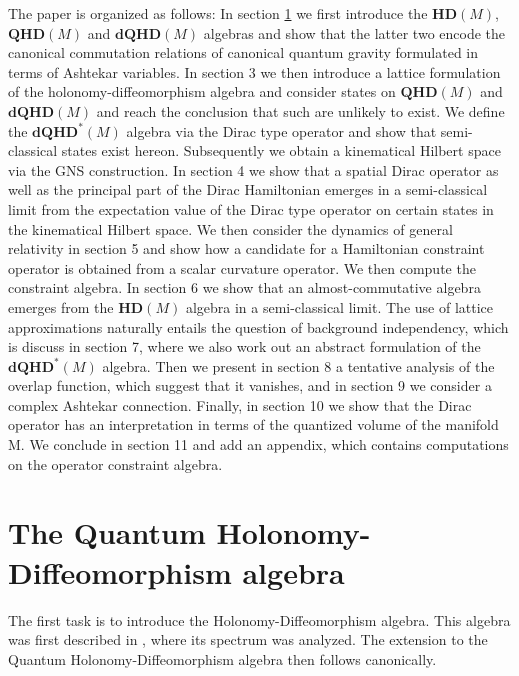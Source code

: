 \documentclass[12pt]{article}
\begin{document}
The paper is organized as follows: In section \ref{firsttask} we first introduce the $\mathbf{HD}(M)$, $\mathbf{QHD}(M)$ and $\mathbf{dQHD}(M)$ algebras and show that the latter two encode the canonical commutation relations of canonical quantum gravity formulated in terms of Ashtekar variables. In section 3 we then introduce a lattice formulation of the holonomy-diffeomorphism algebra and consider states on $\mathbf{QHD}(M)$ and $\mathbf{dQHD}(M)$ and reach the conclusion that such are unlikely to exist. We define the $\mathbf{dQHD}^*(M)$ algebra via the Dirac type operator and show that semi-classical states exist hereon. Subsequently we obtain a kinematical Hilbert space via the GNS construction. 
%
%
In section 4 we show that a spatial Dirac operator as well as the principal part of the Dirac Hamiltonian emerges in a semi-classical limit from the expectation value of the Dirac type operator on certain states in the kinematical Hilbert space. We then consider the dynamics of general relativity in section 5 and show how a candidate for a Hamiltonian constraint operator is obtained from a scalar curvature operator. We then compute the constraint algebra. In section 6 we show that an almost-commutative algebra emerges from the $\mathbf{HD}(M)$ algebra in a semi-classical limit.  
%
The use of lattice approximations naturally entails the question of background independency, which is discuss in section 7, where we also work out an abstract formulation of the $\mathbf{dQHD}^*(M)$  algebra. 
%
%
Then we present in section 8 a tentative analysis of the overlap function, which suggest that it vanishes, and in section 9 we consider a complex Ashtekar connection. 
 Finally, in section 10 we show that the Dirac operator has an interpretation in terms of the quantized volume of the manifold M.
 We conclude in section 11 and add an appendix, which contains computations on the operator constraint algebra.





\section{The Quantum Holonomy-Diffeomorphism algebra}
\label{firsttask}

The first task is to introduce the Holonomy-Diffeomorphism algebra. This algebra was first described in \cite{Aastrup:2012vq, AGnew}, where its spectrum was analyzed. The extension to the Quantum Holonomy-Diffeomorphism algebra then follows canonically.\\
\end{document}
